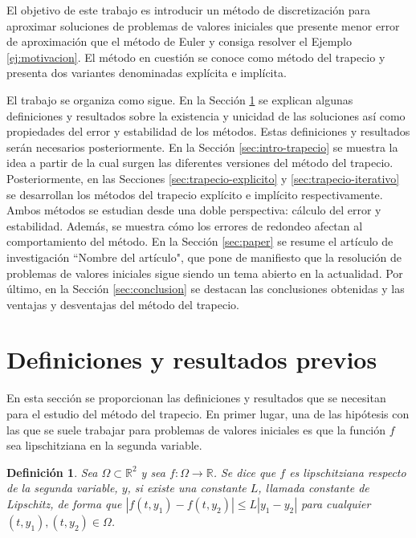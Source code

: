 \documentclass{article}
\theoremstyle{theorem-style}  %
\theoremstyle{definition-style}
\newtheorem{definition}{Definición}[section]
\theoremstyle{example-style}
\begin{document}
	
		
	El objetivo de este trabajo es introducir un método de discretización para aproximar soluciones de problemas de valores iniciales que presente menor error de aproximación que el método de Euler y consiga resolver el Ejemplo \ref{ej:motivacion}. El método en cuestión se conoce como método del trapecio y presenta dos variantes denominadas explícita e implícita. 
	
	El trabajo se organiza como sigue. En la Sección \ref{sec:previo} se explican algunas definiciones y resultados sobre la existencia y unicidad de las soluciones así como propiedades del error y estabilidad de los métodos. Estas definiciones y resultados serán necesarios posteriormente. En la Sección \ref{sec:intro-trapecio} se muestra la idea a partir de la cual surgen las diferentes versiones del método del trapecio. Posteriormente, en las Secciones \ref{sec:trapecio-explicito} y \ref{sec:trapecio-iterativo} se desarrollan los métodos del trapecio explícito e implícito respectivamente. Ambos métodos se estudian desde una doble perspectiva: cálculo del error y estabilidad. Además, se muestra cómo los errores de redondeo afectan al comportamiento del método. En la Sección \ref{sec:paper} se resume el artículo de investigación ``Nombre del artículo", que pone de manifiesto que la resolución de problemas de valores iniciales sigue siendo un tema abierto en la actualidad. Por último, en la Sección \ref{sec:conclusion} se destacan las conclusiones obtenidas y las ventajas y desventajas del método del trapecio.
	
\section{Definiciones y resultados previos} \label{sec:previo}
	
	En esta sección se proporcionan las definiciones y resultados que se necesitan para el estudio del método del trapecio. En primer lugar, una de las hipótesis con las que se suele trabajar para problemas de valores iniciales es que la función $f$ sea lipschitziana en la segunda variable.
	
	\begin{definition}
		Sea $\Omega \subset \mathbb{R}^2$ y sea $f : \Omega \rightarrow \mathbb{R}$. Se dice que $f$ es lipschitziana respecto de la segunda variable, $y$, si existe una constante $L$, llamada constante de Lipschitz, de forma que $|f(t,y_1) - f(t, y_2)| \le L|y_1 - y_2|$ para cualquier $(t,y_1), (t,y_2) \in \Omega$.  
	\end{definition}
	
\end{document}
